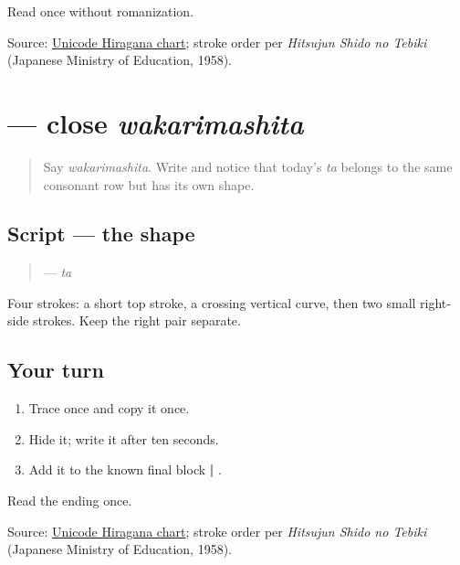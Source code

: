 \begin{tcolorbox}[breakable,colback=teal!4,colframe=teal!35!black,title={Before you move on}]
Read \textbf{} once without romanization.

Source: \href{https://www.unicode.org/charts/PDF/U3040.pdf}{Unicode Hiragana chart}; stroke order per \emph{Hitsujun Shido no Tebiki} (Japanese Ministry of Education, 1958).
\end{tcolorbox}
\section[\texorpdfstring{\ja{た} (ta)}{た (ta)}]{ — close \emph{wakarimashita}}

\label{lesson:JA-W11-ta}



\begin{quote}
Say \emph{wakarimashita}. Write \textbf{} and notice that today's \emph{ta} belongs to the same consonant row but has its own shape.
\end{quote}

\subsection*{Script — the shape}

\begin{quote}
\textbf{} — \emph{ta}
\end{quote}

Four strokes: a short top stroke, a crossing vertical curve, then two small right-side strokes. Keep the right pair separate.

\subsection*{Your turn}
\begin{enumerate}
\raggedright
  \item Trace \textbf{} once and copy it once.
  \item Hide it; write it after ten seconds.
  \item Add it to the known final block \textbf{ | }.
\end{enumerate}

\begin{tcolorbox}[breakable,colback=teal!4,colframe=teal!35!black,title={Before you move on}]
Read the ending \textbf{} once.

Source: \href{https://www.unicode.org/charts/PDF/U3040.pdf}{Unicode Hiragana chart}; stroke order per \emph{Hitsujun Shido no Tebiki} (Japanese Ministry of Education, 1958).
\end{tcolorbox}
